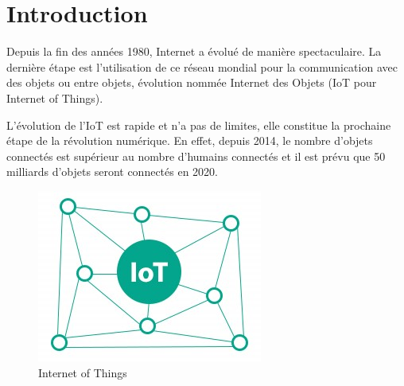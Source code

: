 \section*{Introduction}
Depuis la fin des années 1980, Internet a évolué de manière spectaculaire. La dernière étape est l’utilisation de ce réseau mondial pour la communication avec des objets ou entre objets, évolution nommée Internet des Objets (IoT pour Internet of Things).

L’évolution de l’IoT est rapide et n’a pas de limites, elle constitue la prochaine étape de la révolution numérique. En effet, depuis 2014, le nombre d’objets connectés est supérieur au nombre d’humains connectés et il est prévu que 50 milliards d’objets seront connectés en 2020.

\begin{figure}[h]
	\centering
    \includegraphics[scale=0.8]{img/3.1}
    \caption{Internet of Things}
\end{figure}
